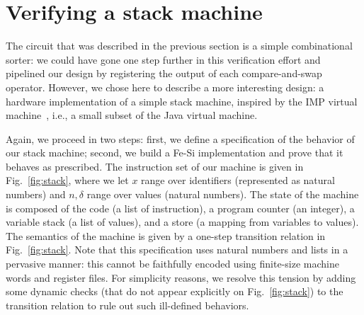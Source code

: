 \documentclass{llncs}
\begin{document}
\section{Verifying a stack machine}
The circuit that was described in the previous section is a simple
combinational sorter: we could have gone one step further in this
verification effort and pipelined our design by registering the output
of each compare-and-swap operator. However, we chose here to describe
a more interesting design: a hardware implementation of a simple stack
machine, inspired by the IMP virtual
machine~\cite{Leroy-Marktoberdorf-09}, i.e., a small subset of the
Java virtual machine.

Again, we proceed in two steps: first, we define a specification of
the behavior of our stack machine; second, we build a Fe-Si
implementation and prove that it behaves as prescribed. 
%
The instruction set of our machine is given in Fig.~\ref{fig:stack},
where we let $x$ range over identifiers (represented as natural
numbers) and $n,\delta$ range over values (natural numbers).
%
The state of the machine is composed of the code (a list of
instruction), a program counter (an integer), a variable stack (a list
of values), and a store (a mapping from variables to values). The
semantics of the machine is given by a one-step transition relation in Fig.~\ref{fig:stack}.
%
Note that this specification uses natural numbers and lists in a
pervasive manner: this cannot be faithfully encoded using finite-size
machine words and register files. 
%
For simplicity reasons, we resolve this tension by adding some dynamic
checks (that do not appear explicitly on Fig.~\ref{fig:stack}) to the
transition relation to rule out such ill-defined behaviors.
\end{document}
